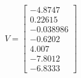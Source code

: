$$ V = \left[\begin{matrix}-4.8747\\0.22615\\-0.038986\\-0.6202\\4.007\\-7.8012\\-6.8333\end{matrix}\right]$$